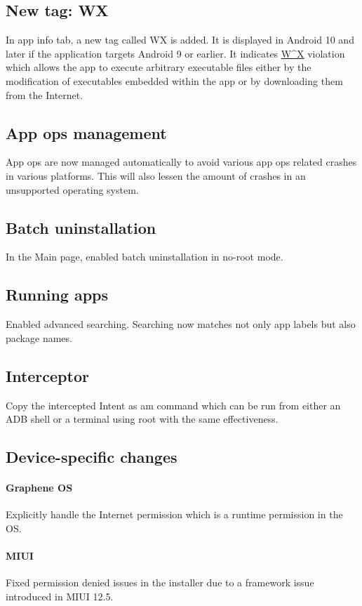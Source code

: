 \subsection{New tag: WX}
In app info tab, a new tag called WX is added. It is displayed in Android 10 and later if the application targets
Android 9 or earlier. It indicates \href{https://en.wikipedia.org/wiki/W\%5EX}{W\^{}X} violation which allows the app to execute arbitrary executable files either by the modification of executables embedded within the app or by downloading them from the Internet.

\subsection{App ops management}
App ops are now managed automatically to avoid various app ops related crashes in various platforms.
This will also lessen the amount of crashes in an unsupported operating system.

\subsection{Batch uninstallation}
In the Main page, enabled batch uninstallation in no-root mode.

\subsection{Running apps}
Enabled advanced searching. Searching now matches not only app labels but also package names.

\subsection{Interceptor}
Copy the intercepted Intent as am command which can be run from either an ADB shell or a terminal using root with the same effectiveness.

\subsection{Device-specific changes}
\paragraph{Graphene OS} Explicitly handle the Internet permission which is a runtime permission in the OS.
\paragraph{MIUI} Fixed permission denied issues in the installer due to a framework issue introduced in MIUI 12.5.
